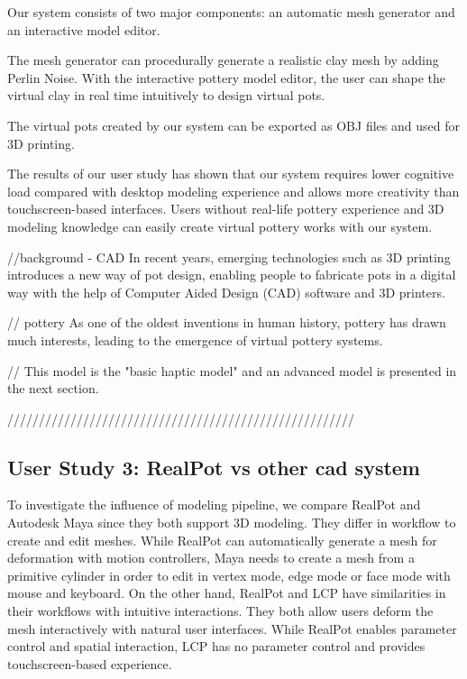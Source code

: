 Our system consists of two major components: an automatic mesh generator and an interactive model editor.

The mesh generator can procedurally generate a realistic clay mesh by adding Perlin Noise. With the interactive pottery model editor, the user can shape the virtual clay in real time intuitively to design virtual pots.

The virtual pots created by our system can be exported as OBJ files and used for 3D printing.

The results of our user study has shown that our system requires lower cognitive load compared with desktop modeling experience and allows more creativity than touchscreen-based interfaces. Users without real-life pottery experience and 3D modeling knowledge can easily create virtual pottery works with our system.

//background - CAD
In recent years, emerging technologies such as 3D printing introduces a new way of pot design, enabling people to fabricate pots in a digital way with the help of Computer Aided Design (CAD) software and 3D printers.

// pottery 
As one of the oldest inventions in human history, pottery has drawn much interests, leading to the emergence of virtual pottery systems.




// This model is the "basic haptic model" and an advanced model is presented in the next section.

///////////////////////////////////////////////////////


\subsection{User Study 3: RealPot vs other cad system}
\label{sec:study3}
To investigate the influence of modeling pipeline, we compare RealPot and Autodesk Maya since they both support 3D modeling. They differ in workflow to create and edit meshes. While RealPot can automatically generate a mesh for deformation with motion controllers, Maya needs to create a mesh from a primitive cylinder in order to edit in vertex mode, edge mode or face mode with mouse and keyboard. 
On the other hand, RealPot and LCP have similarities in their workflows with intuitive interactions. They both allow users deform the mesh interactively with natural user interfaces. While RealPot enables parameter control and spatial interaction, LCP has no parameter control and provides touchscreen-based experience.

